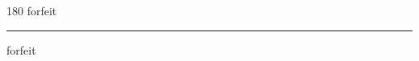 
\begin{frame}
\begin{center}
\begin{turn}{180}
{\fontsize{2.5cm}{1em}\selectfont forfeit}
\end{turn}
\vspace{1em}\par  
\hrule
\vspace{1em}\par  
{\fontsize{2.5cm}{1em}\selectfont forfeit}
\end{center}
\end{frame}
